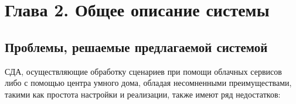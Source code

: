 \documentclass[14pt, a4paper]{extreport}
\begin{document}
\newpage

\chapter{Глава 2. Общее описание системы}

\section{Проблемы, решаемые предлагаемой системой}

СДА, осуществляющие обработку сценариев при помощи облачных сервисов либо с помощью центра умного дома, обладая несомненными преимуществами, такими как простота настройки и
реализации, также имеют ряд недостатков:
\end{document}
